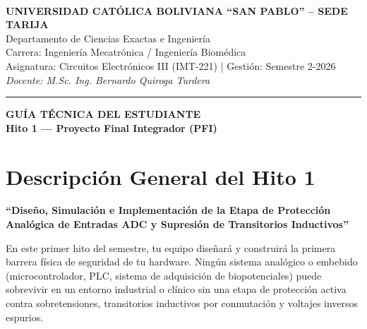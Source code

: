 \documentclass[11pt, a4paper]{article}
\begin{document}
\begin{center}
    \vspace{0.2cm}\\
    {\Large \textbf{UNIVERSIDAD CATÓLICA BOLIVIANA ``SAN PABLO'' -- SEDE TARIJA}}\\[0.2cm]
    {\large Departamento de Ciencias Exactas e Ingeniería}\\[0.1cm]
    {\large Carrera: Ingeniería Mecatrónica / Ingeniería Biomédica}\\[0.1cm]
    {\large Asignatura: Circuitos Electrónicos III (IMT-221) | Gestión: Semestre 2-2026}\\[0.1cm]
    \textit{Docente: M.Sc. Ing. Bernardo Quiroga Turdera}
    \vspace{0.3cm}
    \hrule
    \vspace{0.4cm}
    {\huge \textbf{GUÍA TÉCNICA DEL ESTUDIANTE}}\\[0.2cm]
    {\LARGE \textbf{Hito 1 --- Proyecto Final Integrador (PFI)}}
\end{center}

\vspace{0.5cm}

\section{Descripción General del Hito 1}
\textbf{``Diseño, Simulación e Implementación de la Etapa de Protección Analógica de Entradas ADC y Supresión de Transitorios Inductivos''}

En este primer hito del semestre, tu equipo diseñará y construirá la primera barrera física de seguridad de tu hardware. Ningún sistema analógico o embebido (microcontrolador, PLC, sistema de adquisición de biopotenciales) puede sobrevivir en un entorno industrial o clínico sin una etapa de protección activa contra sobretensiones, transitorios inductivos por conmutación y voltajes inversos espurios.
\end{document}
